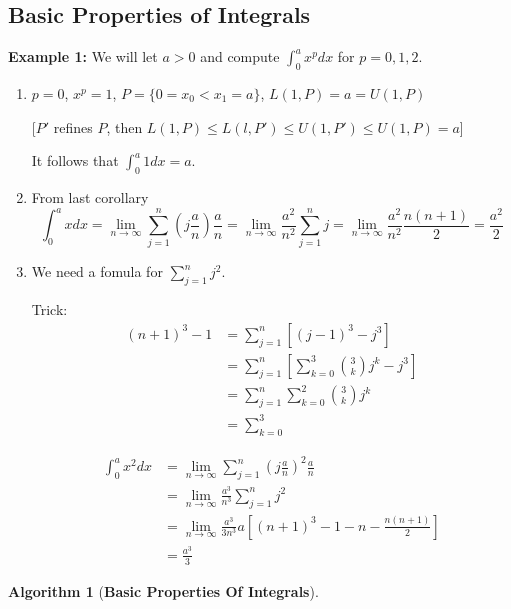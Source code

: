 \documentclass[12pt]{article}
\theoremstyle{plain}
\newtheorem{algorithm}{Algorithm}[subsection]
\begin{document}
	\subsection{Basic Properties of Integrals}
	{\color{Brown}
	\textbf{Example 1: }
	We will let $a>0$ and compute $\int_0^a x^p dx$ for $p = 0, 1, 2$.
	\begin{enumerate}
		\item $p=0$, $x^p = 1$, $P = \{0 = x_0<x_1=a\}$, 
			$L(1,P) = a = U(1,P)$ 

			[$P'$ refines $P$, then $L(1,P) \leq L(l,P')\leq U(1,P') \leq 
			U(1,P) = a$]

			It follows that $\int_0^a 1 dx = a$. 
		\item From last corollary 
			\[
				\int_0^a x dx 
				= \lim_{n\to\infty} \sum_{j=1}^n (j\frac an)\frac an
				= \lim_{n\to\infty} \frac{a^2}{n^2} \sum_{j=1}^n j
				=\lim_{n\to\infty} \frac{a^2}{n^2} \frac{n(n+1)}2
				=\frac{a^2}2
			\]
		\item We need a fomula for $\sum_{j=1}^n j^2$. 

			Trick: 
			\begin{align*}
				(n+1)^3 - 1 
				&= \sum_{j=1}^n [(j-1)^3 - j^3] \tag{telescope}\\
				&= \sum_{j=1}^n [\sum_{k=0}^3 \binom{3}{k} j^k - j^3] 
				\tag{binomial theorem} \\
				&= \sum_{j=1}^n \sum_{k=0}^2 \binom{3}{k} j^k \\
				&= \sum_{k=0}^3 
			\end{align*}

			\begin{align*}
				\int_0^a x^2 dx 
				&= \lim_{n\to\infty} \sum_{j=1}^n (j\frac an)^2 \frac an\\
				&= \lim_{n\to\infty} \frac {a^3}{n^3} \sum_{j=1}^n j^2\\
				&= \lim_{n\to\infty} \frac{a^3}{3n^3} 
	a			[(n+1)^3-1-n-\frac{n(n+1)}2]\\
				&= \frac{a^3}3
			\end{align*}
	\end{enumerate}
	}

	\begin{algorithm}[\textbf{Basic Properties Of Integrals}]
			
	\end{algorithm}
\end{document}
